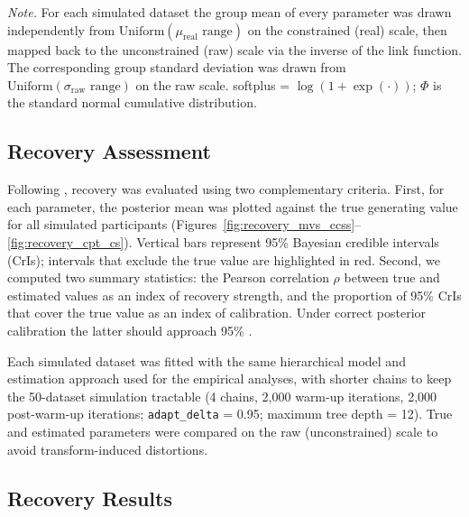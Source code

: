 \documentclass[man,floatsintext]{apa7}
\begin{document}
\begin{table}[!htbp]
\begin{threeparttable}
\begin{tablenotes}[flushleft]
\small
\item \textit{Note.} For each simulated dataset the group mean of every parameter was drawn independently from $\text{Uniform}(\mu_{\text{real}}\text{ range})$ on the constrained (real) scale, then mapped back to the unconstrained (raw) scale via the inverse of the link function. The corresponding group standard deviation was drawn from $\text{Uniform}(\sigma_{\text{raw}}\text{ range})$ on the raw scale. softplus = $\log(1+\exp(\cdot))$; $\Phi$ is the standard normal cumulative distribution.
\end{tablenotes}
\end{threeparttable}
\end{table}

\subsection{Recovery Assessment}

Following \textcite{baribault_troubleshooting_2025}, recovery was evaluated using two complementary criteria. First, for each parameter, the posterior mean was plotted against the true generating value for all simulated participants (Figures~\ref{fig:recovery_mvs_ccss}--\ref{fig:recovery_cpt_cs}). Vertical bars represent 95\% Bayesian credible intervals (CrIs); intervals that exclude the true value are highlighted in red. Second, we computed two summary statistics: the Pearson correlation $\rho$ between true and estimated values as an index of recovery strength, and the proportion of 95\% CrIs that cover the true value as an index of calibration. Under correct posterior calibration the latter should approach 95\% \parencite{rubin_bayesianly_1984}.

Each simulated dataset was fitted with the same hierarchical model and estimation approach used for the empirical analyses, with shorter chains to keep the 50-dataset simulation tractable (4 chains, 2{,}000 warm-up iterations, 2{,}000 post-warm-up iterations; \texttt{adapt\_delta} = 0.95; maximum tree depth = 12). True and estimated parameters were compared on the raw (unconstrained) scale to avoid transform-induced distortions.

\subsection{Recovery Results}
\end{document}
